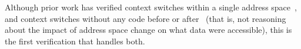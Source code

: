 Although prior work has verified context switches within a single address space~\cite{ni2007contexts}, and context switches
without any code before or after~\cite{syeda2020formal} (that is, not reasoning about the impact of address space change
on what data were accessible), this is the first verification that handles both.

\begin{comment}
\[  
$\specline{\exists (\entryf ,\;\entrytr,\; \entrytw,\; \entryo,\;\textsf{pte\_addr },\paddr) \; \ldotp\textsf{P} \ast \mathcal{I}\texttt{ASpace}(\theta,m) \ast  \texttt{r14}\mapsto_{\textsf{r}} \_ \ast \texttt{rdi}\mapsto_{r} \vaddr \ast \texttt{rax}\mapsto_{\textsf{r}} \textsf{ pte\_addr} \; \ast }_{\rtv}$
$\specline{ \ulcorner  \texttt{addr\_L1 }(\vaddr, \entryo) = \paddr \urcorner \ast \ulcorner \texttt{entry\_present } \entryf \land \texttt{entry\_present } \entrytr \land  \texttt{entry\_present } \entrytw \urcorner \; \ast}_{\rtv}$
$\specline{\nfpointsto{\mask\vaddr\maskfour\rtv}{\mask\vaddr\maskfouroff\rtv}\entryf\qone\naddr \; \ast \nfpointsto{\mask\vaddr\maskthree\entryf}{\mask\vaddr\maskthreeoff\entryf}\entrytr\qtwo\naddr \ast}_{\rtv}$ 
$\specline{  \nfpointsto{\mask\vaddr\masktwo\entrytr}{\mask\vaddr\masktwooff\entrytr}\paddr\qthree\entryo \;\ast \texttt{pte\_addr} \mapsto_{\texttt{vpte}} \paddr \;(\texttt{wzero 64}) \ast \texttt{rax}\mapsto_{\textsf{r}} \texttt{pte\_addr}  }_{\rtv}$
mov r14, rax ;; Save that before another call
$\specline{\textsf{P} \ast \mathcal{I}\texttt{ASpace}(\theta,m) \ast  \texttt{r14}\mapsto_{\textsf{r}} \texttt{pte\_addr} \ast \texttt{rdi}\mapsto_{\textsf{r}} \vaddr \ast \texttt{rax}\mapsto_{\textsf{r}} \textsf{ pte\_addr} \; \ast }_{\rtv}$
$\specline{ \nfpointsto{\mask\vaddr\maskfour\rtv}{\mask\vaddr\maskfouroff\rtv}\entryf\qone\naddr \ast \ulcorner \texttt{entry\_present } \entryf \land \texttt{entry\_present } \entrytr \land  \texttt{entry\_present } \entrytw \urcorner \ast}_{\rtv}$ 
$\specline{  \nfpointsto{\mask\vaddr\maskthree\entryf}{\mask\vaddr\maskthreeoff\entryf}\entrytr\qtwo\naddr \ast \nfpointsto{\mask\vaddr\masktwo\entrytr}{\mask\vaddr\masktwooff\entrytr}\paddr\qthree\entryo \;\ast}_{\rtv}$
$\specline{\texttt{pte\_addr} \mapsto_{\texttt{vpte}} \paddr \;(\texttt{wzero 64}) \ast \texttt{rax}\mapsto_{\textsf{r}} \texttt{pte\_addr}  }_{\rtv}$
call alloc_phys_page_or_panic
$\specline{\textsf{P} \ast \mathcal{I}\texttt{ASpace}(\theta,m) \ast  \texttt{r14}\mapsto_{\textsf{r}} \texttt{pte\_addr} \ast \texttt{rdi}\mapsto_{\textsf{r}} \vaddr \;\ast \nfpointsto{\mask\vaddr\maskfour\rtv}{\mask\vaddr\maskfouroff\rtv}\entryf\qone\naddr \ast}_{\rtv}$ 

\end{comment}
